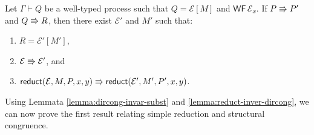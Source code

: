 \begin{lemma} \label{lemma:reduct-inver-dircong}
  Let $\Gamma \vdash Q$ be a well-typed process such that $Q = \mathcal{E}[M]$
  and $\mathsf{WF} \, \mathcal{E}_x$.
  If $P \Rrightarrow P'$ and $Q \Rrightarrow R$, then there exist $\mathcal{E}'$ and $M'$ such that:
  \begin{enumerate}[label=(\roman*)]
    \item $R = \mathcal{E}'[M']$,
    \item $\mathcal{E} \Rrightarrow \mathcal{E}'$, and
    \item $\mathsf{reduct}(\mathcal{E}, M, P, x, y) \Rrightarrow \mathsf{reduct}(\mathcal{E}', M', P', x, y)$.
  \end{enumerate}
\end{lemma}

Using Lemmata \ref{lemma:dircong-invar-subst} and \ref{lemma:reduct-inver-dircong},
we can now prove the first result relating simple reduction and structural congruence.

